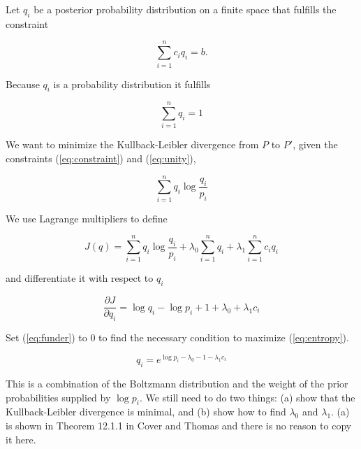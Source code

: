 \documentclass[phd,12pt,oneside]{ubcthesis}
\begin{document}
Let $q_{i}$ be a posterior probability distribution on a finite space that
fulfills the constraint

\begin{equation}
  \label{eq:constraint}
\sum_{i=1}^{n}c_{i}q_{i}=b.
\end{equation}

{\noindent}Because $q_{i}$ is a probability distribution it fulfills

\begin{equation}
  \label{eq:unity}
\sum_{i=1}^{n}q_{i}=1
\end{equation}

{\noindent}We want to minimize the Kullback-Leibler divergence from
$P$ to $P'$, given the constraints
({\ref{eq:constraint}}) and ({\ref{eq:unity}}),

\begin{equation}
  \label{eq:entropy}
\sum_{i=1}^{n}q_{i}\log\frac{q_{i}}{p_{i}}
\end{equation}

{\noindent}We use Lagrange multipliers to define 

\begin{equation}
  \label{eq:functional}
J(q)=\sum_{i=1}^{n}q_{i}\log\frac{q_{i}}{p_{i}}+\lambda_{0}\sum_{i=1}^{n}q_{i}+\lambda_{1}\sum_{i=1}^{n}c_{i}q_{i}
\end{equation}

{\noindent}and differentiate it with respect to $q_{i}$

\begin{equation}
  \label{eq:funder}
\frac{\partial{}J}{\partial{}q_{i}}=\log{}q_{i}-\log{}p_{i}+1+\lambda_{0}+\lambda_{1}c_{i}
\end{equation}

{\noindent}Set ({\ref{eq:funder}}) to $0$ to find the necessary condition to
maximize ({\ref{eq:entropy}}). 

\begin{equation}
  \label{eq:coverthomas}
q_{i}=e^{\log{}p_{i}-\lambda_{0}-1-\lambda_{1}c_{i}}
\end{equation}

{\noindent}This is a combination of the Boltzmann distribution and the
weight of the prior probabilities supplied by $\log{}p_{i}$. We still
need to do two things: (a) show that the Kullback-Leibler divergence is minimal,
and (b) show how to find $\lambda_{0}$ and $\lambda_{1}$. (a) is shown
in Theorem 12.1.1 in Cover and Thomas  and
there is no reason to copy it here.
\end{document}

